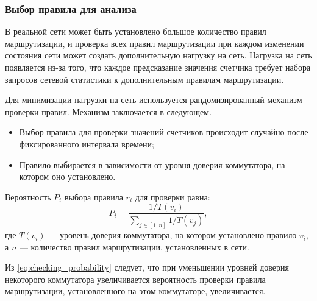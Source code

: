 \documentclass[../thesis.tex]{subfiles}
\begin{document}
\subsubsection{Выбор правила для анализа}

В реальной сети может быть установлено большое количество правил маршрутизации, и проверка всех правил маршрутизации при каждом изменении состояния сети может создать дополнительную нагрузку на сеть.
Нагрузка на сеть появляется из-за того, что каждое предсказание значения счетчика требует набора запросов сетевой статистики к дополнительным правилам маршрутизации.

Для минимизации нагрузки на сеть используется рандомизированный механизм проверки правил.
Механизм заключается в следующем.
\begin{itemize}
\item Выбор правила для проверки значений счетчиков происходит случайно после фиксированного интервала времени;
\item Правило выбирается в зависимости от уровня доверия коммутатора, на котором оно установлено.
\end{itemize}

Вероятность $P_i$ выбора правила $r_i$ для проверки равна:
\begin{equation} \label{eq:checking_probability}
P_i = \frac{1 / T(v_i)}{\sum_{j\in [1,n]}{1 / T(v_j)}},
\end{equation}
где $T(v_i)$ --- уровень доверия коммутатора, на котором установлено правило $v_i$, а $n$ --- количество правил маршрутизации, установленных в сети.

Из \eqref{eq:checking_probability} следует, что при уменьшении уровней доверия некоторого коммутатора увеличивается вероятность проверки правила маршрутизации, установленного на этом коммутаторе, увеличивается.
\end{document}
